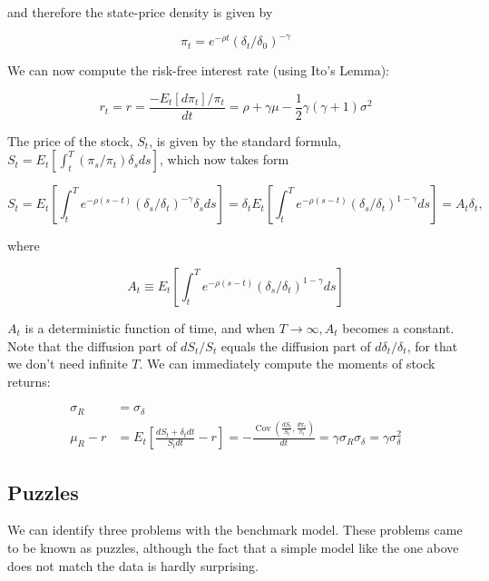 \documentclass[\topdir/lecture\_notes.tex]{subfiles}
\begin{document}
and therefore the state-price density is given by

\begin{equation}
\pi_{t}=e^{-\rho t}\left(\delta_{t} / \delta_{0}\right)^{-\gamma}
\end{equation}

We can now compute the risk-free interest rate (using Ito's Lemma):

\begin{equation}
r_{t}=r=\frac{-E_{t}\left[d \pi_{t}\right] / \pi_{t}}{d t}=\rho+\gamma \mu-\frac{1}{2} \gamma(\gamma+1) \sigma^{2} \label{eq:9.1.1}
\end{equation}

The price of the stock, \(S_{t}\), is given by the standard formula, \(S_{t}=E_{t}\left[\int_{t}^{T}\left(\pi_{s} / \pi_{t}\right) \delta_{s} d s\right]\), which now takes form

\begin{equation}
S_{t}=E_{t}\left[\int_{t}^{T} e^{-\rho(s-t)}\left(\delta_{s} / \delta_{t}\right)^{-\gamma} \delta_{s} d s\right]=\delta_{t} E_{t}\left[\int_{t}^{T} e^{-\rho(s-t)}\left(\delta_{s} / \delta_{t}\right)^{1-\gamma} d s\right]=A_{t} \delta_{t}, \label{eq:9.1.2}
\end{equation}

where

\begin{equation}
A_{t} \equiv E_{t}\left[\int_{t}^{T} e^{-\rho(s-t)}\left(\delta_{s} / \delta_{t}\right)^{1-\gamma} d s\right]
\end{equation}

\(A_{t}\) is a deterministic function of time, and when \(T \rightarrow \infty, A_{t}\) becomes a constant. Note that the diffusion part of \(d S_{t} / S_{t}\) equals the diffusion part of \(d \delta_{t} / \delta_{t}\), for that we don't need infinite \(T\). We can immediately compute the moments of stock returns:

\begin{align}
\sigma_{R} & =\sigma_{\delta}  \label{eq:9.1.3}\\
\mu_{R}-r & =E_{t}\left[\frac{d S_{t}+\delta_{t} d t}{S_{t} d t}-r\right]=-\frac{\operatorname{Cov}\left(\frac{d S_{t}}{S_{t}}, \frac{d \pi_{t}}{\pi_{t}}\right)}{d t}=\gamma \sigma_{R} \sigma_{\delta}=\gamma \sigma_{\delta}^{2}
\label{eq:9.1.4}
\end{align}

\subsection{Puzzles}
We can identify three problems with the benchmark model. These problems came to be known as puzzles, although the fact that a simple model like the one above does not match the data is hardly surprising.
\end{document}
